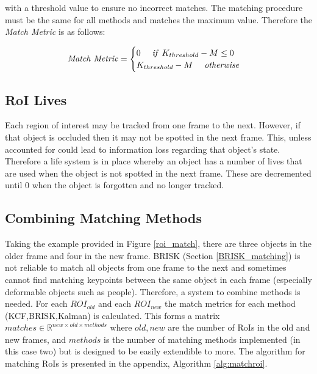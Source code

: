 \documentclass[11pt,twoside]{report}
\begin{document}
with a threshold value to ensure no incorrect matches. The matching procedure must be the same for all methods and matches the maximum value. Therefore the \textit{Match Metric} is as follows:

\begin{equation}
\begin{aligned}
\textnormal{\textit{Match Metric}} = 
\begin{cases}
0 \quad \textnormal{\textit{ if }} K_{threshold}-M \leq 0 \\
K_{threshold}-M \quad \textnormal{\textit{ otherwise}}
\end{cases}
\end{aligned}
\end{equation}


\subsection{RoI Lives}
Each region of interest may be tracked from one frame to the next. However, if that object is occluded then it may not be spotted in the next frame. This, unless accounted for could lead to information loss regarding that object's state. Therefore a life system is in place whereby an object has a number of lives that are used when the object is not spotted in the next frame. These are decremented until 0 when the object is forgotten and no longer tracked.  


\subsection{Combining Matching Methods} \label{matching_combining_methods}
Taking the example provided in Figure \ref{roi_match}, there are three objects in the older frame and four in the new frame. BRISK (Section \ref{BRISK_matching}) is not reliable to match all objects from one frame to the next and sometimes cannot find matching keypoints between the same object in each frame (especially deformable objects such as people). Therefore, a system to combine methods is needed. For each $ROI_{old}$ and each $ROI_{new}$ the match metrics for each method (KCF,BRISK,Kalman) is calculated. This forms a matrix $matches \in \mathbb{R}^{new \times old \times methods}$ where $old,new$ are the number of RoIs in the old and new frames, and 
$methods$ is the number of matching methods implemented (in this case two) but is designed to be easily extendible to more. The algorithm for matching RoIs is presented in the appendix, Algorithm \ref{alg:matchroi}.
\newline
\end{document}
